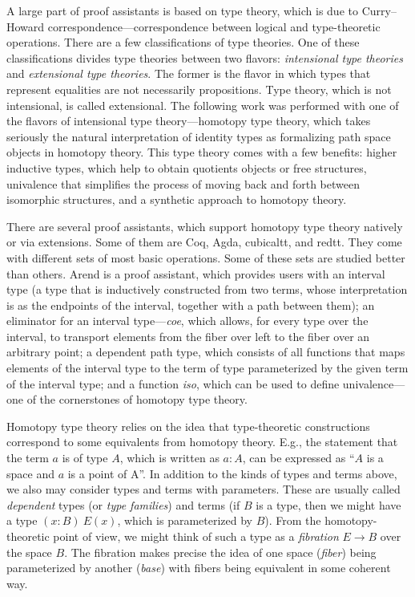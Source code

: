 A large part of proof assistants is based on type theory, which is due to Curry–Howard correspondence---correspondence between logical and type-theoretic operations. There are a few classifications of type theories. One of these classifications divides type theories between two flavors: \textit{intensional type theories} and \textit{extensional type theories}. The former is the flavor in which types that represent equalities are not necessarily propositions. Type theory, which is not intensional, is called extensional. The following work was performed with one of the flavors of intensional type theory---homotopy type theory, which takes seriously the natural interpretation of identity types as formalizing path space objects in homotopy theory. This type theory comes with a few benefits: higher inductive types, which help to obtain quotients objects or free structures, univalence that simplifies the process of moving back and forth between isomorphic structures, and a synthetic approach to homotopy theory.

There are several proof assistants, which support homotopy type theory natively or via extensions. Some of them are Coq\autocite{Coq}, Agda\autocite{Agda}, cubicaltt\autocite{Cubicaltt}, and redtt\autocite{Redtt}. They come with different sets of most basic operations. Some of these sets are studied better than others. Arend\autocite{Arend} is a proof assistant, which provides users with an interval type (a type that is inductively constructed from two terms, whose interpretation is as the endpoints of the interval, together with a path between them); an eliminator for an interval type---\textit{coe}, which allows, for every type over the interval, to transport elements from the fiber over left to the fiber over an arbitrary point; a dependent path type, which consists of all functions that maps elements of the interval type to the term of type parameterized by the given term of the interval type; and a function \textit{iso}, which can be used to define univalence---one of the cornerstones of homotopy type theory\autocite{Arenddocs}\autocite{nlab}.

Homotopy type theory relies on the idea that type-theoretic constructions correspond to some equivalents from homotopy theory. E.g., the statement that the term $a$ is of type $A$, which is written as $a:A$, can be expressed as ``$A$ is a space and $a$ is a point of A''. In addition to the kinds of types and terms above, we also may consider types and terms with parameters. These are usually called \textit{dependent} types (or \textit{type families}) and terms (if $B$ is a type, then we might have a type $(x:B)\ E(x)$, which is parameterized by $B$). From the homotopy-theoretic point of view, we might think of such a type as a \textit{fibration} $E \to B$ over the space $B$. The fibration makes precise the idea of one space (\textit{fiber}) being parameterized by another (\textit{base}) with fibers being equivalent in some coherent way. %


